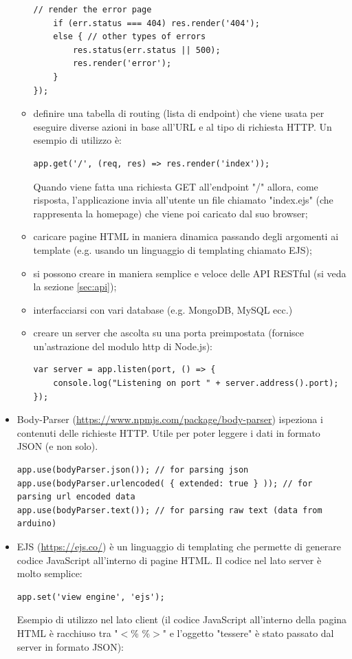 \documentclass[12pt]{report}
\begin{document}
\begin{itemize}
\begin{itemize}
\begin{lstlisting}
// render the error page
	if (err.status === 404) res.render('404');
	else { // other types of errors
		res.status(err.status || 500);
		res.render('error');
	}
});
\end{lstlisting}
		\item definire una tabella di routing (lista di endpoint) che viene usata per eseguire diverse azioni in base all'URL e al tipo di richiesta HTTP. Un esempio di utilizzo è: 	
\begin{lstlisting}
app.get('/', (req, res) => res.render('index'));
\end{lstlisting}
		Quando viene fatta una richiesta GET all'endpoint "/" allora, come risposta, l'applicazione invia all'utente un file chiamato "index.ejs" (che rappresenta la homepage) che viene poi caricato dal suo browser;
		\item caricare pagine HTML in maniera dinamica passando degli argomenti ai template (e.g. usando un linguaggio di templating chiamato EJS);
		\item si possono creare in maniera semplice e veloce delle API RESTful (si veda la sezione \ref{sec:api});
		\item interfacciarsi con vari database (e.g. MongoDB, MySQL ecc.)
		\item creare un server che ascolta su una porta preimpostata (fornisce un'astrazione del modulo http di Node.js):
\begin{lstlisting}
var server = app.listen(port, () => {
	console.log("Listening on port " + server.address().port);
});
\end{lstlisting}   
	\end{itemize}
	\item Body-Parser (\url{https://www.npmjs.com/package/body-parser}) ispeziona i contenuti delle richieste HTTP. Utile per poter leggere i dati in formato JSON (e non solo). 
\begin{lstlisting}
app.use(bodyParser.json()); // for parsing json
app.use(bodyParser.urlencoded( { extended: true } )); // for parsing url encoded data
app.use(bodyParser.text()); // for parsing raw text (data from arduino)
\end{lstlisting}
	\item EJS (\url{https://ejs.co/}) è un linguaggio di templating che permette di generare codice JavaScript all'interno di pagine HTML. Il codice nel lato server è molto semplice: 
\begin{lstlisting}
app.set('view engine', 'ejs');
\end{lstlisting}
Esempio di utilizzo nel lato client (il codice JavaScript all'interno della pagina HTML è racchiuso tra "$<$\% \%$>$" e l'oggetto "tessere" è stato passato dal server in formato JSON):

\end{itemize}
\end{document}
